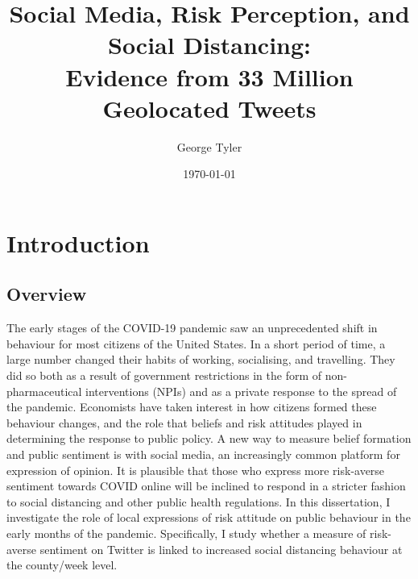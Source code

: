 \documentclass{article}
\author{George Tyler}
\date{\today}
\begin{document}
\title{Social Media, Risk Perception, and Social Distancing: \\ Evidence from 33 Million Geolocated Tweets}

\maketitle

\section{Introduction}
\subsection{Overview}
The early stages of the COVID-19 pandemic saw an unprecedented shift in behaviour for most citizens of the United States. In a short period of time, a large number changed their habits of working, socialising, and travelling. They did so both as a result of government restrictions in the form of non-pharmaceutical interventions (NPIs) and as a private response to the spread of the pandemic. Economists have taken interest in how citizens formed these behaviour changes, and the role that beliefs and risk attitudes played in determining the response to public policy. A new way to measure belief formation and public sentiment is with social media, an increasingly common platform for expression of opinion. It is plausible that those who express more risk-averse sentiment towards COVID online will be inclined to respond in a stricter fashion to social distancing and other public health regulations. In this dissertation, I investigate the role of local expressions of risk attitude on public behaviour in the early months of the pandemic. Specifically, I study whether a measure of risk-averse sentiment on Twitter is linked to increased social distancing behaviour at the county/week level. 
\end{document}
